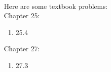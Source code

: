 \documentclass[11pt]{article}
\begin{document}
\hspace{2mm}\\

\noindent Here are some textbook problems:\\

\noindent Chapter 25:  
\begin{enumerate}
  \setlength{\itemsep}{0mm}
\item 25.4
\end{enumerate}

\noindent Chapter 27:  
\begin{enumerate}
  \setlength{\itemsep}{0mm}
\item 27.3
\end{enumerate}
\end{document}
